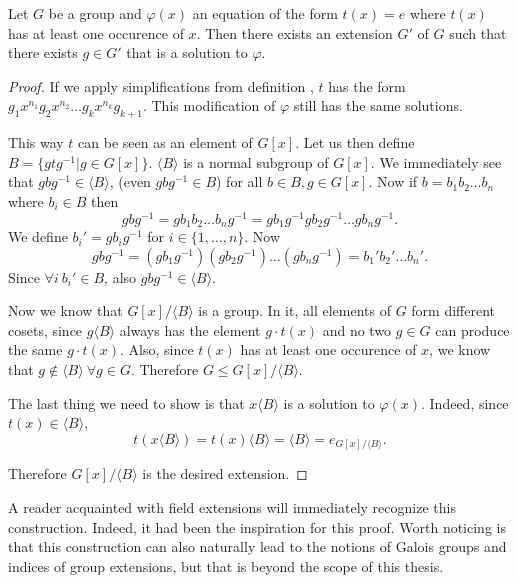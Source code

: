 \begin{thm}
	Let $G$ be a group and $\varphi(x)$ an equation of the form $t(x)=e$ where $t(x)$ has at least one occurence of $x$. Then there exists an extension $G'$ of $G$ such that there exists $g\in G'$ that is a solution to $\varphi$.
\end{thm}
\begin{proof}
If we apply simplifications from definition , $t$ has the form $g_1 x^{n_1}g_2 x^{n_2}\dots g_k x^{n_k}g_{k+1}$. This modification of $\varphi$ still has the same solutions.

This way $t$ can be seen as an element of $G[x]$. Let us then define $B=\{gtg^{-1}|g\in G[x]\}$. $\langle B\rangle$ is a normal subgroup of $G[x]$. We immediately see that $gbg^{-1}\in \langle B\rangle$, (even $gbg^{-1}\in B$) for all $b\in B, g\in G[x]$. Now if $b=b_1 b_2\dots b_n$ where $b_i\in B$ then $$gbg^{-1}=gb_1 b_2\dots b_ng^{-1}=gb_1g^{-1}g b_2g^{-1}\dots gb_ng^{-1}.$$
We define ${b_i}'=gb_ig^{-1}$ for $i\in\{1,\dots,n\}$. Now $$gbg^{-1}=(gb_1g^{-1})(g b_2g^{-1})\dots (gb_ng^{-1})={b_1}'{b_2}'\dots{b_n}'.$$
Since $\forall i\ {b_i}'\in B$, also $gbg^{-1}\in \langle B\rangle$.

Now we know that $G[x]/\langle B \rangle$ is a group. In it, all elements of $G$ form different cosets, since $g\langle B \rangle$ always has the element $g\cdot t(x)$ and no two $g\in G$ can produce the same $g\cdot t(x)$. Also, since $t(x)$ has at least one occurence of $x$, we know that $g\notin \langle B \rangle\ \forall g\in G$. Therefore $G\leq G[x]/\langle B \rangle$.

The last thing we need to show is that $x \langle B \rangle$ is a solution to $\varphi(x)$. Indeed, since $t(x)\in\langle B \rangle$, $$t(x\langle B \rangle)=t(x)\langle B \rangle=\langle B \rangle=e_{G[x]/\langle B \rangle}.$$

Therefore $G[x]/\langle B \rangle$ is the desired extension.
\end{proof}

A reader acquainted with field extensions will immediately recognize this construction. Indeed, it had been the inspiration for this proof. Worth noticing is that this construction can also naturally lead to the notions of Galois groups and indices of group extensions, but that is beyond the scope of this thesis.


